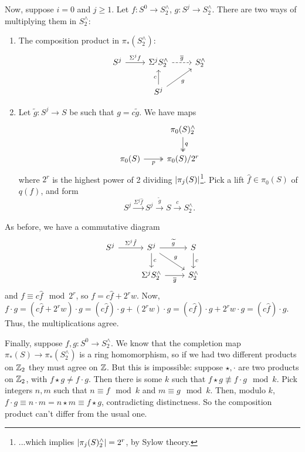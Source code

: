\documentclass{MetricNotes2023}
\def\inte{\ensuremath\mathbb{Z}}
\begin{document}
\begin{itemize}
\begin{enumerate}
Now, suppose \(i=0\) and \(j\geq 1\). Let \(f : S^0 \to S^\wedge_2\), \(g : S^j \to S^\wedge_2 \). There are two ways of multiplying them in \(S^\wedge_2\): \begin{enumerate}
\item The composition product in \(\pi_*(S^\wedge_2)\):
\[\begin{tikzcd}
S^{j} \arrow[r, "\Sigma^j f"]  & \Sigma^j S^\wedge_2 \arrow[r, "\overline g", dashrightarrow] & S^\wedge_2 \\ 
 & S^j \arrow[u, "c"] \arrow[ur, "g"'] &  
 \end{tikzcd}\] 
\item Let \(\widetilde g : S^j \to S\) be such that \(g=c\widetilde g\). We have maps 
\[\begin{tikzcd}
  & \pi_0(S)^\wedge_2 \arrow[d, "q", twoheadrightarrow]  \\
\pi_0(S) \arrow[r, swap, "p", twoheadrightarrow]  & \pi_0(S)/2^r
\end{tikzcd}\]
where \(2^r\) is the highest power of 2 dividing \(\lvert\pi_j(S)\rvert\)\footnote{...which implies \(\lvert\pi_j(S)^\wedge_2\rvert=2^r\), by Sylow theory.}. Pick a lift \(\hat f\in \pi_0(S)\) of \(q(f)\), and form
\[S^j \xrightarrow{\Sigma^j \hat f}S^j \xrightarrow{\widetilde g} S \xrightarrow{c}S^\wedge_2.\]
\end{enumerate}
As before, we have a commutative diagram
\[\begin{tikzcd}
S^{j} \arrow[r, "\Sigma^j \hat f"]  & S^j \arrow[dr, "g"] \arrow[r, "\widetilde g"] \arrow[d, "c"] & S \arrow[d, "c"] \\ 
 & \Sigma^j S^\wedge_2 \arrow[r, "\overline g"'] & S^\wedge_2 
 \end{tikzcd}\] 
and \(f \equiv c\hat f \mod 2^r\), so \(f=c\hat f + 2^rw\). Now, \(f\cdot g=(c\hat f + 2^rw)\cdot g=(c\hat f)\cdot g + (2^rw)\cdot g=(c\hat f)\cdot g + 2^rw\cdot g=(c\hat f)\cdot g\). Thus, the multiplications agree.

Finally, suppose \(f, g : S^0 \to S^\wedge_2\). We know that the completion map \(\pi_*(S)\to \pi_*(S^\wedge_2)\) is a ring homomorphism, so if we had two different products on \(\inte_2\) they must agree on \(\inte\). But this is impossible: suppose \(\star, \cdot\) are two products on \(\inte_2\), with \(f\star g \neq f \cdot g\). Then there is some \(k\) such that \(f \star g \not\equiv f \cdot g \mod k\). Pick integers \(n, m \) such that \(n\equiv f \mod k\) and \(m \equiv g \mod k\). Then, modulo \(k\), \(f\cdot g \equiv n\cdot m =n\star m \equiv f \star g\), contradicting distinctness. So the composition product can't differ from the usual one. 


\end{enumerate}
\end{itemize}
\end{document}
